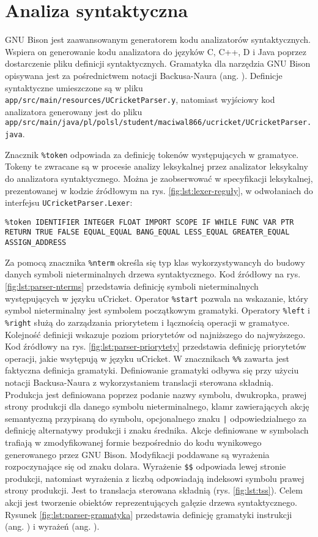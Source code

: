 \section{Analiza syntaktyczna}
GNU Bison  \cite{BisonGNUProject} jest zaawansowanym generatorem kodu analizatorów syntaktycznych. Wspiera on generowanie kodu analizatora do języków C, C++, D i Java poprzez dostarczenie pliku definicji syntaktycznych. Gramatyka dla narzędzia GNU Bison opisywana jest za pośrednictwem notacji Backusa-Naura (ang. ). Definicje syntaktyczne umieszczone są w pliku \lstinline|app/src/main/resources/UCricketParser.y|, natomiast wyjściowy kod analizatora generowany jest do pliku \lstinline|app/src/main/java/pl/polsl/student/maciwal866/ucricket/UCricketParser.java|.

Znacznik \lstinline|%token| odpowiada za definicję tokenów występujących w gramatyce. Tokeny te zwracane są w procesie analizy leksykalnej przez analizator leksykalny do analizatora syntaktycznego. Można je zaobserwować w specyfikacji leksykalnej, prezentowanej w kodzie źródłowym na rys. \ref{fig:lst:lexer-reguły}, w odwołaniach do interfejsu \lstinline|UCricketParser.Lexer|:
\begin{lstlisting}
%token IDENTIFIER INTEGER FLOAT IMPORT SCOPE IF WHILE FUNC VAR PTR RETURN TRUE FALSE EQUAL_EQUAL BANG_EQUAL LESS_EQUAL GREATER_EQUAL ASSIGN_ADDRESS
\end{lstlisting} 
Za pomocą znacznika \lstinline|%nterm| określa się typ klas wykorzystywancyh do budowy danych symboli nieterminalnych drzewa syntaktycznego. Kod źródłowy na rys. \ref{fig:lst:parser-nterms} przedstawia definicję symboli nieterminalnych występujących w języku uCricket.
Operator \lstinline|%start| pozwala na wskazanie, który symbol nieterminalny jest symbolem początkowym gramatyki.
Operatory \lstinline|%left| i \lstinline|%right| służą do zarządzania priorytetem i łącznością operacji w gramatyce. Kolejność definicji wskazuje poziom priorytetów od najniższego do najwyższego. Kod źródłowy na rys. \ref{fig:lst:parser-priorytety} przedstawia definicję priorytetów operacji, jakie wsytępują w języku uCricket.
W znacznikach \lstinline|%%| zawarta jest faktyczna definicja gramatyki. Definiowanie gramatyki odbywa się przy użyciu notacji Backusa-Naura z wykorzystaniem translacji sterowana składnią. Produkcja jest definiowana poprzez podanie nazwy symbolu, dwukropka, prawej strony produkcji dla danego symbolu nieterminalnego, klamr zawierających akcję semantyczną przypisaną do symbolu, opcjonalnego znaku \lstinline/|/ odpowiedzialnego za definicję alternatywy produkcji i znaku średnika. Akcje definiowane w symbolach trafiają w zmodyfikowanej formie bezpośrednio do kodu wynikowego generowanego przez GNU Bison. Modyfikacji poddawane są wyrażenia rozpoczynające się od znaku dolara. Wyrażenie \lstinline|$$| odpowiada lewej stronie produkcji, natomiast wyrażenia z liczbą odpowiadają indeksowi symbolu prawej strony produkcji. Jest to translacja sterowana składnią (rys. \ref{fig:lst:tss}). Celem akcji jest tworzenie obiektów reprezentujących gałęzie drzewa syntaktycznego. Rysunek \ref{fig:lst:parser-gramatyka} przedstawia definicję gramatyki instrukcji (ang. ) i wyrażeń (ang. ).
